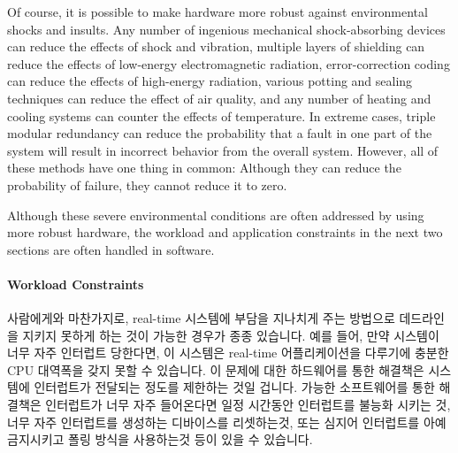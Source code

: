 Of course, it is possible to make hardware more robust against
environmental shocks and insults.
Any number of ingenious mechanical shock-absorbing devices can reduce the
effects of shock and vibration, multiple layers of shielding can reduce
the effects of low-energy electromagnetic radiation, error-correction
coding can reduce the effects of high-energy radiation, various potting
and sealing techniques can reduce the effect of air quality, and any
number of heating and cooling systems can counter the effects of temperature.
In extreme cases, triple modular redundancy can reduce the probability that
a fault in one part of the system will result in incorrect behavior from
the overall system.
However, all of these methods have one thing in common:  Although they
can reduce the probability of failure, they cannot reduce it to zero.

Although these severe environmental conditions are often addressed by using
more robust hardware, the
workload and application constraints in the next two sections are often
handled in software.
\fi

\paragraph{Workload Constraints}
\label{sec:advsync:Workload Constraints}

사람에게와 마찬가지로, real-time 시스템에 부담을 지나치게 주는 방법으로
데드라인을 지키지 못하게 하는 것이 가능한 경우가 종종 있습니다.
예를 들어, 만약 시스템이 너무 자주 인터럽트 당한다면, 이 시스템은 real-time
어플리케이션을 다루기에 충분한 CPU 대역폭을 갖지 못할 수 있습니다.
이 문제에 대한 하드웨어를 통한 해결책은 시스템에 인터럽트가 전달되는 정도를
제한하는 것일 겁니다.
가능한 소프트웨어를 통한 해결책은 인터럽트가 너무 자주 들어온다면 일정 시간동안
인터럽트를 불능화 시키는 것, 너무 자주 인터럽트를 생성하는 디바이스를
리셋하는것, 또는 심지어 인터럽트를 아예 금지시키고 폴링 방식을 사용하는것 등이
있을 수 있습니다.

